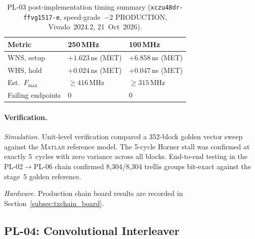 \vspace{-40pt}
\leavevmode\par
\begin{table}[!h]
  \caption{PL-03 post-implementation timing summary
           (\texttt{xczu48dr\allowbreak-ffvg1517\allowbreak-e}, speed-grade~$-2$
           PRODUCTION, Vivado~2024.2, 21~Oct~2026).}
  \label{tab:pl03_timing}
  \centering
  \begin{tabular}{lll}
    \hline
    Metric             & 250\,MHz           & 100\,MHz           \\
    \hline
    WNS, setup         & $+1.623$\,ns (MET) & $+6.858$\,ns (MET) \\[2pt]
    WHS, hold          & $+0.024$\,ns (MET) & $+0.047$\,ns (MET) \\[2pt]
    Est.\ $F_{\max}$   & $\geq 416$\,MHz    & $\geq 315$\,MHz    \\[2pt]
    Failing endpoints  & 0                  & 0                  \\
    \hline
  \end{tabular}
\end{table}
\FloatBarrier


\FloatBarrier
\paragraph{Verification.}

\textit{Simulation.}
Unit-level verification compared a 352-block golden vector sweep against
the \textsc{Matlab} reference model.
The 5-cycle Horner stall was confirmed at exactly 5~cycles with zero
variance across all blocks.
End-to-end testing in the PL-02$\to$PL-06 chain confirmed
8{,}304/8{,}304 trellis groups bit-exact against the stage~5 golden
reference.

\textit{Hardware.}
Production chain board results are recorded in Section~\ref{subsec:txchain_board}.


\subsection{PL-04: Convolutional Interleaver}
\label{subsec:pl04}


